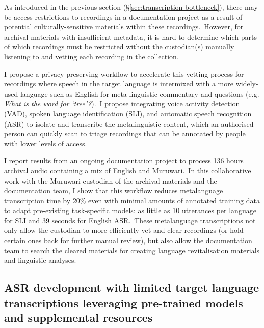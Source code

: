 \documentclass[main.tex]{subfiles}
\begin{document}
As introduced in the previous section (§\ref{sec:transcription-bottleneck}), there may be access restrictions to recordings in a documentation project as a result of potential culturally-sensitive materials within these recordings.~However, for archival materials with insufficient metadata, it is hard to determine which parts of which recordings must be restricted without the custodian(s) manually listening to and vetting each recording in the collection.

I propose a privacy-preserving workflow to accelerate this vetting process for recordings where speech in the target language is intermixed with a more widely-used language such as English for meta-linguistic commentary and questions (e.g. \textit{What is the word for `tree'?}).~I propose integrating voice activity detection (VAD), spoken language identification (SLI), and automatic speech recognition (ASR) to isolate and transcribe the metalinguistic content, which an authorised person can quickly scan to triage recordings that can be annotated by people with lower levels of access.

I report results from an ongoing documentation project to process 136 hours archival audio containing a mix of English and Muruwari.~In this collaborative work with the Muruwari custodian of the archival materials and the documentation team, I show that this workflow reduces metalanguage transcription time by 20\% even with minimal amounts of annotated training data to adapt pre-existing task-specific models: as little as 10 utterances per language for SLI and 39 seconds for English ASR.~These metalanguage transcriptions not only allow the custodian to more efficiently vet and clear recordings (or hold certain ones back for further manual review), but also allow the documentation team to search the cleared materials for creating language revitalisation materials and linguistic analyses.

\subsection{ASR development with limited target language transcriptions leveraging pre-trained models and supplemental resources}
\end{document}
